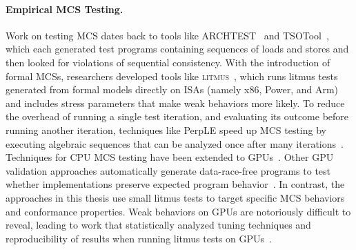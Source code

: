 \paragraph{Empirical MCS Testing.} Work on testing MCS dates back to tools like ARCHTEST~\cite{archtest} and TSOTool~\cite{hangal2004tsotool}, which each generated test programs containing sequences of loads and stores and then looked for violations of sequential consistency. With the introduction of formal MCSs, researchers developed tools like \textsc{litmus}~\cite{alglave2011litmus}, which runs litmus tests generated from formal models directly on ISAs (namely x86, Power, and Arm) and includes stress parameters that make weak behaviors more likely. To reduce the overhead of running a single test iteration, and evaluating its outcome before running another iteration, techniques like PerpLE speed up MCS testing by executing algebraic sequences that can be analyzed once after many iterations~\cite{melissaris2020perple}. Techniques for CPU MCS testing have been extended to GPUs~\cite{alglave2015gpu,kirkham2020foundations}. Other GPU validation approaches automatically generate data-race-free programs to test whether implementations preserve expected program behavior~\cite{ta2019autonomous}. In contrast, the approaches in this thesis use small litmus tests to target specific MCS behaviors and conformance properties. Weak behaviors on GPUs are notoriously difficult to reveal, leading to work that statistically analyzed tuning techniques and reproducibility of results when running litmus tests on GPUs~\cite{kirkham2020foundations}.

